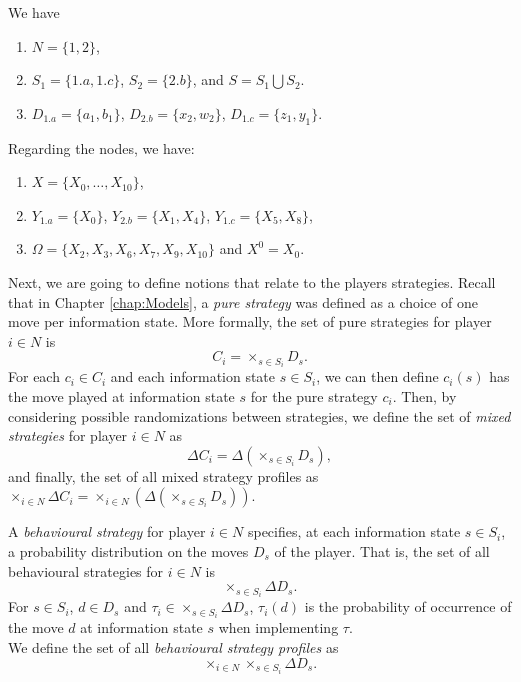\begin{example}
We have
\begin{enumerate}
\item  $N = \{1,2\}$,
\item $S_1 = \{1.a, 1.c\}$, $S_2 = \{2.b\}$, and $S = S_1 \bigcup S_2$. 
\item $D_{1.a} = \{a_1,b_1\}$, $D_{2.b} = \{x_2,w_2\}$, $D_{1.c} = \{z_1, y_1\}$. 
\end{enumerate}
Regarding the nodes, we have:
\begin{enumerate}[resume]
\item $X = \{X_0, \ldots, X_{10}\}$, 
\item $Y_{1.a} = \{X_0\}$, $Y_{2.b} = \{X_1, X_4\} $, $Y_{1.c} = \{X_5, X_8\}$, 
\item $\Omega = \{X_2, X_3, X_6, X_7, X_9, X_{10}\}$ and $X^0 = X_0$. 
\end{enumerate}
\label{ch4:ex:Formalism}
\end{example}

Next, we are going to define notions that relate to the players strategies. 
Recall that in Chapter \ref{chap:Models}, a \emph{pure strategy} was defined as a choice of one move per information state. More formally, the set of pure strategies for player $i \in N$ is 
$$ C_i = \times_{s \in S_i} D_s.$$
For each $c_i \in C_i$ and each information state $s \in S_i$, we can then define $c_i(s)$ has the move played at information state $s$ for the pure strategy $c_i$.
Then, by considering possible randomizations between strategies, we define the set of \emph{mixed strategies} for player $i \in N$ as
\begin{equation}
\Delta C_i = \Delta\left ( \times_{s \in S_i} D_s \right ),
\label{ch4:eq:mixedStrat}
\end{equation}
and finally, the set of all mixed strategy profiles as $\times_{i \in N} \Delta C_i = \times_{i \in N}  \left( \Delta\left ( \times_{s \in S_i} D_s \right ) \right )$. 

\begin{definition}
A \emph{behavioural strategy} for player $i \in N$ specifies, at each information state $s \in S_i$, a probability distribution on the moves $D_s$ of the player. That is, the set of all behavioural strategies for $i \in N$ is 
\begin{equation}
\times_{s \in S_i}  \Delta D_s.
\label{ch4:eq:behav}
\end{equation}
For $s \in S_i$, $d \in D_s$ and $\tau_i \in \times_{s \in S_i}  \Delta D_s$, $\tau_i(d)$ is the probability of occurrence of the move $d$ at information state $s$ when implementing $\tau$. \\
We define the set of all \emph{behavioural strategy profiles} as
$$ \times_{i \in N} \times_{s \in S_i} \Delta D_s.$$
\end{definition}

